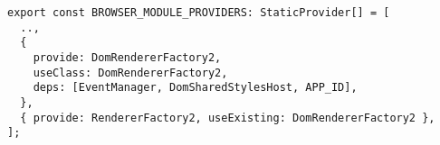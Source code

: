 \begin{verbatim}
export const BROWSER_MODULE_PROVIDERS: StaticProvider[] = [
  ..,
  {
    provide: DomRendererFactory2,
    useClass: DomRendererFactory2,
    deps: [EventManager, DomSharedStylesHost, APP_ID],
  },
  { provide: RendererFactory2, useExisting: DomRendererFactory2 },
];
\end{verbatim}
